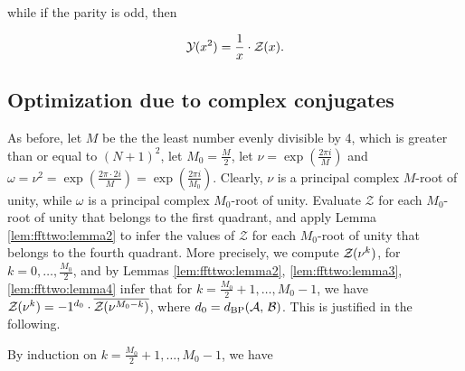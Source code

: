 while if the parity is odd, then

\begin{align}
\label{eq:ffttwo:oddY}
\emYof{}{x^2} = \frac{1}{x} \cdot \emZ{}.
\end{align}

\subsection{Optimization due to complex conjugates}
\label{subsec:ffttwo:compconj}

As before, let $M$ be the the least number evenly divisible by 4, which is
greater than or equal to $(N+1)^2$, let $M_0=\frac{M}{2}$, let $\nu = \exp(\frac{2 \pi i}{M})$
and $\omega=\nu^2 = \exp(\frac{2 \pi \cdot 2i}{M}) =
\exp(\frac{2 \pi i}{M_0})$. Clearly, $\nu$ is a principal complex
$M$-root of unity, while $\omega$ is a principal complex $M_0$-root
of unity. Evaluate $\mathcal Z$ for each $M_0$-root of unity
that belongs to the first quadrant, and apply Lemma \ref{lem:ffttwo:lemma2}
 to infer the values
of $\mathcal Z$ for each $M_0$-root of unity that belongs to the
fourth quadrant. More precisely,
we compute ${\mathcal Z}_{}(\nu^k)$, for $k=0,\dots,\frac{M_0}{2}$, and by Lemmas
\ref{lem:ffttwo:lemma2}, \ref{lem:ffttwo:lemma3}, \ref{lem:ffttwo:lemma4} infer
that for $k=\frac{M_0}{2}+1,\dots,M_0-1$, we have
${\mathcal Z}_{}(\nu^{k})= -1^{d_0} \cdot \overline{{\mathcal Z}_{}(\nu^{M_0-k})}$,
where
$d_0 = d_{\text{BP}}(\mathcal A,\,\mathcal B)$. This is justified in the following.

By induction on $k=\frac{M_0}{2}+1,\dots,M_0-1$, we have

\newlength{\maxLengthCases}

